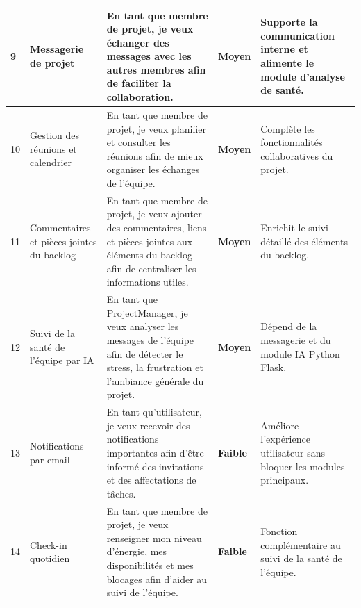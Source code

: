 \begin{longtable}{|p{0.8cm}|p{3.7cm}|p{5.3cm}|p{1.8cm}|p{3.8cm}|}
  9           & Messagerie de projet                      & En tant que membre de projet, je veux échanger des messages avec les autres membres afin de faciliter la collaboration.                                      & \cellcolor{niveauMoyen}\textbf{Moyen}       & Supporte la communication interne et alimente le module d'analyse de santé.                \\
  \hline

  10          & Gestion des réunions et calendrier        & En tant que membre de projet, je veux planifier et consulter les réunions afin de mieux organiser les échanges de l'équipe.                                  & \cellcolor{niveauMoyen}\textbf{Moyen}       & Complète les fonctionnalités collaboratives du projet.                                     \\
  \hline

  11          & Commentaires et pièces jointes du backlog & En tant que membre de projet, je veux ajouter des commentaires, liens et pièces jointes aux éléments du backlog afin de centraliser les informations utiles. & \cellcolor{niveauMoyen}\textbf{Moyen}       & Enrichit le suivi détaillé des éléments du backlog.                                        \\
  \hline

  12          & Suivi de la santé de l'équipe par IA      & En tant que ProjectManager, je veux analyser les messages de l'équipe afin de détecter le stress, la frustration et l'ambiance générale du projet.           & \cellcolor{niveauMoyen}\textbf{Moyen}       & Dépend de la messagerie et du module IA Python Flask.                                      \\
  \hline

  13          & Notifications par email                   & En tant qu'utilisateur, je veux recevoir des notifications importantes afin d'être informé des invitations et des affectations de tâches.                    & \cellcolor{niveauFaible}\textbf{Faible}     & Améliore l'expérience utilisateur sans bloquer les modules principaux.                     \\
  \hline

  14          & Check-in quotidien                        & En tant que membre de projet, je veux renseigner mon niveau d'énergie, mes disponibilités et mes blocages afin d'aider au suivi de l'équipe.                 & \cellcolor{niveauFaible}\textbf{Faible}     & Fonction complémentaire au suivi de la santé de l'équipe.                                  \\
  \hline
\end{longtable}

